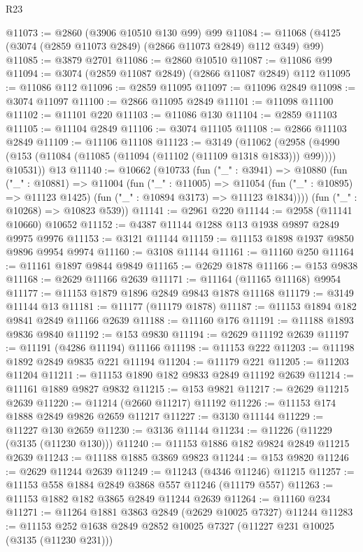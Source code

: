 \begin{lexlean}{R23}
\begin{coremodule}
@11073 := @2860 (@3906 @10510 @130 @99) @99
@11084 := @11068 (@4125 (@3074 (@2859 @11073 @2849) (@2866 @11073 @2849) @112 @349) @99)
@11085 := @3879 @2701
@11086 := @2860 @10510
@11087 := @11086 @99
@11094 := @3074 (@2859 @11087 @2849) (@2866 @11087 @2849) @112
@11095 := @11086 @112
@11096 := @2859 @11095
@11097 := @11096 @2849
@11098 := @3074 @11097
@11100 := @2866 @11095 @2849
@11101 := @11098 @11100
@11102 := @11101 @220
@11103 := @11086 @130
@11104 := @2859 @11103
@11105 := @11104 @2849
@11106 := @3074 @11105
@11108 := @2866 @11103 @2849
@11109 := @11106 @11108
@11123 := @3149
    (@11062
      (@2958 (@4990 (@153 (@11084 (@11085 (@11094 (@11102 (@11109 @1318 @1833))) @99)))) @10531))
    @13
@11140 := @10662
    (@10733
      (fun ("_" : @3941) =>
      @10880
        (fun ("_" : @10881) =>
        @11004
          (fun ("_" : @11005) =>
          @11054 (fun ("_" : @10895) => @11123 @1425) (fun ("_" : @10894 @3173) => @11123 @1834))))
      (fun ("_" : @10268) => @10823 @539))
@11141 := @2961 @220
@11144 := @2958 (@11141 @10660) @10652
@11152 := @4387 @11144 @1288 @113 @1938 @9897 @2849 @9975 @9976
@11153 := @3121 @11144
@11159 := @11153 @1898 @1937 @9850 @9896 @9954 @9974
@11160 := @3108 @11144
@11161 := @11160 @250
@11164 := @11161 @1897 @9844 @9849
@11165 := @2629 @1878
@11166 := @153 @9838
@11168 := @2629 @11166 @2639
@11171 := @11164 (@11165 @11168) @9954
@11177 := @11153 @1879 @1896 @2849 @9843 @1878 @11168
@11179 := @3149 @11144 @13
@11181 := @11177 (@11179 @1878)
@11187 := @11153 @1894 @182 @9841 @2849 @11166 @2639
@11188 := @11160 @176
@11191 := @11188 @1893 @9836 @9840
@11192 := @153 @9830
@11194 := @2629 @11192 @2639
@11197 := @11191 (@4286 @11194) @11166
@11198 := @11153 @222
@11203 := @11198 @1892 @2849 @9835 @221 @11194
@11204 := @11179 @221
@11205 := @11203 @11204
@11211 := @11153 @1890 @182 @9833 @2849 @11192 @2639
@11214 := @11161 @1889 @9827 @9832
@11215 := @153 @9821
@11217 := @2629 @11215 @2639
@11220 := @11214 (@2660 @11217) @11192
@11226 := @11153 @174 @1888 @2849 @9826 @2659 @11217
@11227 := @3130 @11144
@11229 := @11227 @130 @2659
@11230 := @3136 @11144
@11234 := @11226 (@11229 (@3135 (@11230 @130)))
@11240 := @11153 @1886 @182 @9824 @2849 @11215 @2639
@11243 := @11188 @1885 @3869 @9823
@11244 := @153 @9820
@11246 := @2629 @11244 @2639
@11249 := @11243 (@4346 @11246) @11215
@11257 := @11153 @558 @1884 @2849 @3868 @557 @11246 (@11179 @557)
@11263 := @11153 @1882 @182 @3865 @2849 @11244 @2639
@11264 := @11160 @234
@11271 := @11264 @1881 @3863 @2849 (@2629 @10025 @7327) @11244
@11283 := @11153 @252 @1638 @2849 @2852 @10025 @7327 (@11227 @231 @10025 (@3135 (@11230 @231)))

\end{coremodule}
\end{lexlean}
